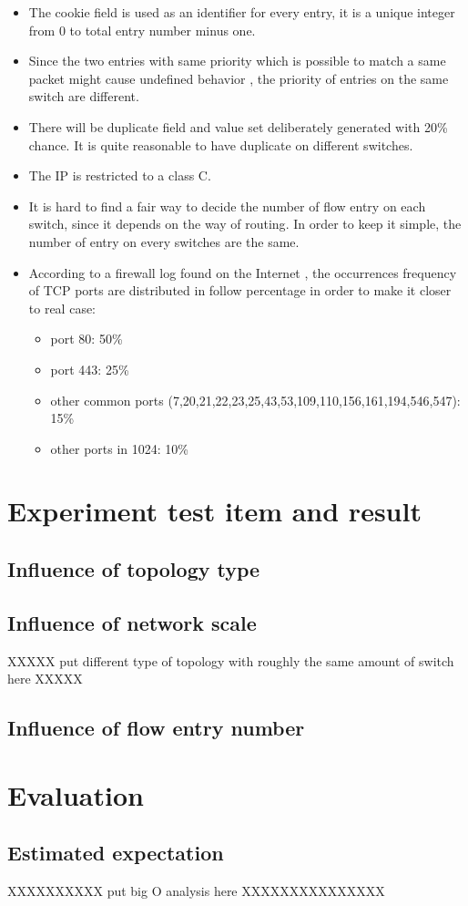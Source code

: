 \begin{itemize}
\item 
The cookie field is used as an identifier for every entry, it is a unique integer from 0 to total entry number minus one. 
\item
Since the two entries with same priority which is possible to match a same packet might cause undefined behavior \cite{OF_SPEC}, the priority of entries on the same switch are different.
\item
There will be duplicate field and value set deliberately generated with 20\% chance. It is quite reasonable to have duplicate on different switches. 
\item
The IP is restricted to a class C.
\item
It is hard to find a fair way to decide the number of flow entry on each switch, since it depends on the way of routing\cite{MPFHMRSV09}. In order to keep it simple, the number of entry on every switches are the same. 
\item
According to a firewall log found on the Internet \cite{PORT_FREQ}, the occurrences frequency of TCP ports are distributed in follow percentage in order to make it closer to real case:
\begin{itemize}
\item
port 80: 50\%
\item
port 443: 25\%
\item
other common ports (7,20,21,22,23,25,43,53,109,110,156,161,194,546,547): 15\%
\item
other ports in 1024: 10\%
\end{itemize}
\end{itemize}

\section{Experiment test item and result}

\subsection{Influence of topology type}

\subsection{Influence of network scale}
XXXXX put different type of topology with roughly the same amount of switch here XXXXX
\subsection{Influence of flow entry number}


\section{Evaluation}

\subsection{Estimated expectation}
XXXXXXXXXX put big O analysis here XXXXXXXXXXXXXXX
